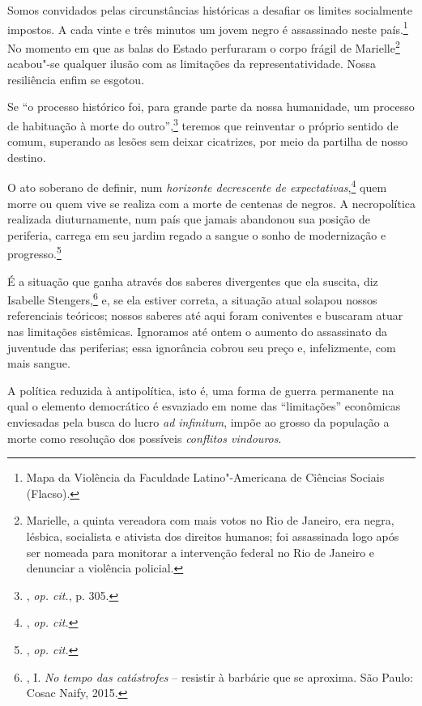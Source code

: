 Somos convidados pelas circunstâncias históricas a desafiar os limites
socialmente impostos. A cada vinte e três minutos um jovem negro é
assassinado neste país.\footnote{Mapa da Violência da Faculdade
  Latino"-Americana de Ciências Sociais (Flacso).} No momento em que as
balas do Estado perfuraram o corpo frágil de Marielle\footnote{Marielle,
  a quinta vereadora com mais votos no Rio de Janeiro, era negra,
  lésbica, socialista e ativista dos direitos humanos; foi assassinada
  logo após ser nomeada para monitorar a intervenção federal no Rio de
  Janeiro e denunciar a violência policial.} acabou"-se qualquer ilusão
com as limitações da representatividade. Nossa resiliência enfim se
esgotou.

Se ``o processo histórico foi, para grande parte da nossa humanidade, um
processo de habituação à morte do outro'',\footnote{, \emph{op. cit.}, p.
  305.} teremos que reinventar o próprio sentido de comum, superando as
lesões sem deixar cicatrizes, por meio da partilha de nosso destino.

O ato soberano de definir, num \emph{horizonte decrescente de
expectativas},\footnote{, \emph{op. cit.}} quem morre ou quem vive se
realiza com a morte de centenas de negros. A necropolítica realizada
diuturnamente, num país que jamais abandonou sua posição de periferia,
carrega em seu jardim regado a sangue o sonho de modernização e
progresso.\footnote{, \emph{op. cit.}}

É a situação que ganha através dos saberes divergentes que ela suscita,
diz Isabelle Stengers,\footnote{, I. \emph{No tempo das
  catástrofes} -- resistir à barbárie que se aproxima. São Paulo: Cosac
  Naify, 2015.} e, se ela estiver correta, a situação atual solapou
nossos referenciais teóricos; nossos saberes até aqui foram coniventes e
buscaram atuar nas limitações sistêmicas. Ignoramos até ontem o aumento
do assassinato da juventude das periferias; essa ignorância cobrou seu
preço e, infelizmente, com mais sangue.

A política reduzida à antipolítica, isto é, uma forma de guerra
permanente na qual o elemento democrático é esvaziado em nome das
``limitações'' econômicas enviesadas pela busca do lucro \emph{ad
infinitum}, impõe ao grosso da população a morte como resolução dos
possíveis \emph{conflitos vindouros}.

